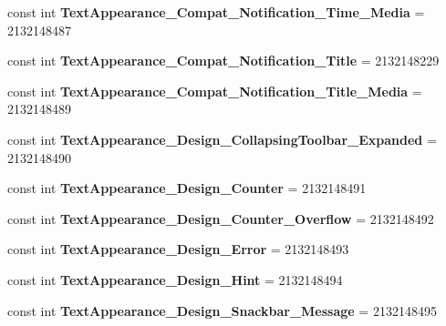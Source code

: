 \begin{DoxyCompactItemize}
const int {\bfseries Text\+Appearance\+\_\+\+Compat\+\_\+\+Notification\+\_\+\+Time\+\_\+\+Media} = 2132148487
\item 
\mbox{\label{classst_delivery_1_1_resource_1_1_style_a38d62d183bea41ce9f3123ad5c7cb8dd}} 
const int {\bfseries Text\+Appearance\+\_\+\+Compat\+\_\+\+Notification\+\_\+\+Title} = 2132148229
\item 
\mbox{\label{classst_delivery_1_1_resource_1_1_style_aef551914e53a2fb83f7d967b986c076b}} 
const int {\bfseries Text\+Appearance\+\_\+\+Compat\+\_\+\+Notification\+\_\+\+Title\+\_\+\+Media} = 2132148489
\item 
\mbox{\label{classst_delivery_1_1_resource_1_1_style_a2b09772f62aad02d30f7f31852b52de1}} 
const int {\bfseries Text\+Appearance\+\_\+\+Design\+\_\+\+Collapsing\+Toolbar\+\_\+\+Expanded} = 2132148490
\item 
\mbox{\label{classst_delivery_1_1_resource_1_1_style_a548aaaaa3ef9d3a48decbab40124d9c8}} 
const int {\bfseries Text\+Appearance\+\_\+\+Design\+\_\+\+Counter} = 2132148491
\item 
\mbox{\label{classst_delivery_1_1_resource_1_1_style_a22fe2063a4237e952e56082310175d37}} 
const int {\bfseries Text\+Appearance\+\_\+\+Design\+\_\+\+Counter\+\_\+\+Overflow} = 2132148492
\item 
\mbox{\label{classst_delivery_1_1_resource_1_1_style_a51a8957393a05de763d98a376e0c3515}} 
const int {\bfseries Text\+Appearance\+\_\+\+Design\+\_\+\+Error} = 2132148493
\item 
\mbox{\label{classst_delivery_1_1_resource_1_1_style_a9d70dbad20aa151c89986d0250d5a7fb}} 
const int {\bfseries Text\+Appearance\+\_\+\+Design\+\_\+\+Hint} = 2132148494
\item 
\mbox{\label{classst_delivery_1_1_resource_1_1_style_a88e198151d8ad653334cb5386a6bd720}} 
const int {\bfseries Text\+Appearance\+\_\+\+Design\+\_\+\+Snackbar\+\_\+\+Message} = 2132148495

\end{DoxyCompactItemize}
